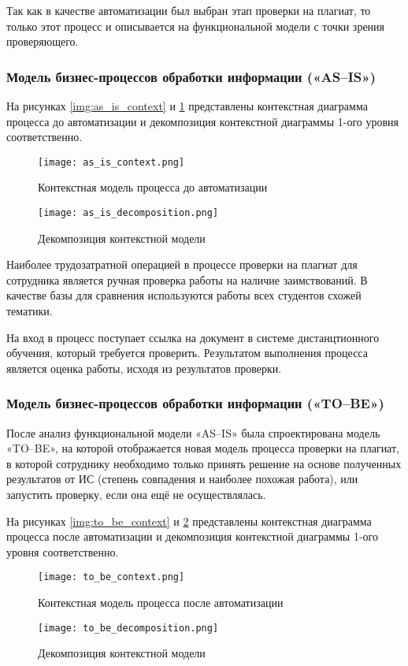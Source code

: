 		Так как в качестве автоматизации был выбран этап проверки на плагиат, то только этот процесс и описывается на функциональной модели с точки зрения проверяющего.

		\subsubsection{Модель бизнес-процессов обработки информации («AS--IS»)}			

			На рисунках \ref{img:as_is_context} и \ref{img:as_is_decomposition} представлены контекстная диаграмма процесса до автоматизации и декомпозиция контекстной диаграммы 1-ого уровня соответственно.

			\begin{figure}[h]
				  \texttt{[image: as\_is\_context.png]}
				  \caption{Контекстная модель процесса до автоматизации}\label{img:as_is_context}
				\endminipage\hfill
				  \texttt{[image: as\_is\_decomposition.png]}
				  \caption{Декомпозиция контекстной модели}\label{img:as_is_decomposition}
				\endminipage\hfill				
			\end{figure}

			Наиболее трудозатратной операцией в процессе проверки на плагиат для сотрудника является ручная проверка работы на наличие заимствований. В качестве базы для сравнения используются работы всех студентов схожей тематики.			

			На вход в процесс поступает ссылка на документ в системе дистанцтионного обучения, который требуется проверить. Результатом выполнения процесса является оценка работы, исходя из результатов проверки.

		\subsubsection{Модель бизнес-процессов обработки информации («TO--BE»)}

			После анализ функциональной модели «AS--IS» была спроектирована модель «TO--BE», на которой отображается новая модель процесса проверки на плагиат, в которой сотруднику необходимо только принять решение на основе полученных результатов от ИС (степень совпадения и наиболее похожая работа), или запустить проверку, если она ещё не осуществлялась.

			На рисунках \ref{img:to_be_context} и \ref{img:to_be_decomposition} представлены контекстная диаграмма процесса после автоматизации и декомпозиция контекстной диаграммы 1-ого уровня соответственно.
			
			\begin{figure}[h]
				  \texttt{[image: to\_be\_context.png]}
				  \caption{Контекстная модель процесса после автоматизации}\label{img:to_be_context}
				\endminipage\hfill
				  \texttt{[image: to\_be\_decomposition.png]}
				  \caption{Декомпозиция контекстной модели}\label{img:to_be_decomposition}
				\endminipage\hfill				
			\end{figure}

